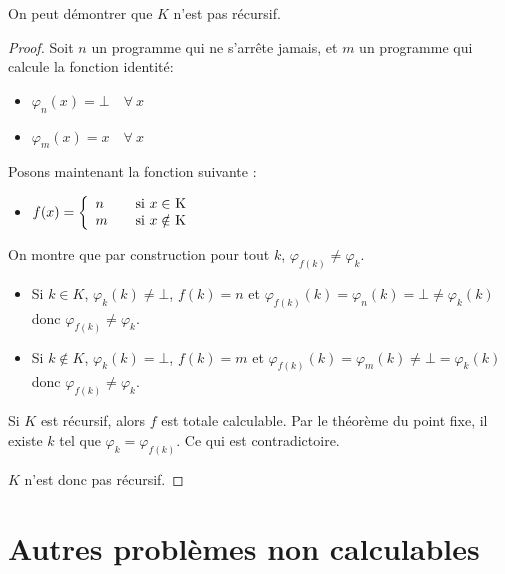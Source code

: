 \begin{myrem}[Démonstration de $K = \{n | \varphi_n(n) \neq \bot \}$ grâce au point fixe]
	On peut démontrer que $K$ n'est pas récursif.

    \begin{proof}
	Soit $n$ un programme qui ne s'arrête jamais, et $m$ un programme qui calcule la fonction identité:
		\begin{itemize}
		\item $\varphi_n(x) = \bot \quad \forall \ x$
		\item $\varphi_m(x) = x \quad \forall  \ x$
	\end{itemize}
	Posons maintenant la  fonction suivante :
	\begin{itemize}

		\item $ f(x) = \left\{
		\begin{array}{l l}
			n & \quad \text{si $x\in$ K}\\
    		m & \quad \text{si $x\notin$ K}
		\end{array} \right.$
	\end{itemize}

    On montre que par construction pour tout $k$, $\varphi_{f(k)} \neq \varphi_k$.
    \begin{itemize}
      \item Si $k \in K$, $\varphi_k(k) \neq \bot$, $f(k) = n$ et
        $\varphi_{f(k)}(k) = \varphi_n(k) = \bot \neq \varphi_k(k)$ donc $\varphi_{f(k)} \neq \varphi_k$.
      \item Si $k \notin K$, $\varphi_k(k) = \bot$, $f(k) = m$ et
        $\varphi_{f(k)}(k) = \varphi_m(k) \neq \bot = \varphi_k(k)$ donc $\varphi_{f(k)} \neq \varphi_k$.
    \end{itemize}
    Si $K$ est récursif, alors $f$ est totale calculable.
	Par le théorème du point fixe, il existe $k$ tel que $\varphi_k = \varphi_{f(k)}$.
    Ce qui est contradictoire.

    $K$ n'est donc pas récursif.
  \end{proof}

\end{myrem}

\section{Autres problèmes non calculables}
\label{sec:autres_probl_mes_non_calculable}

